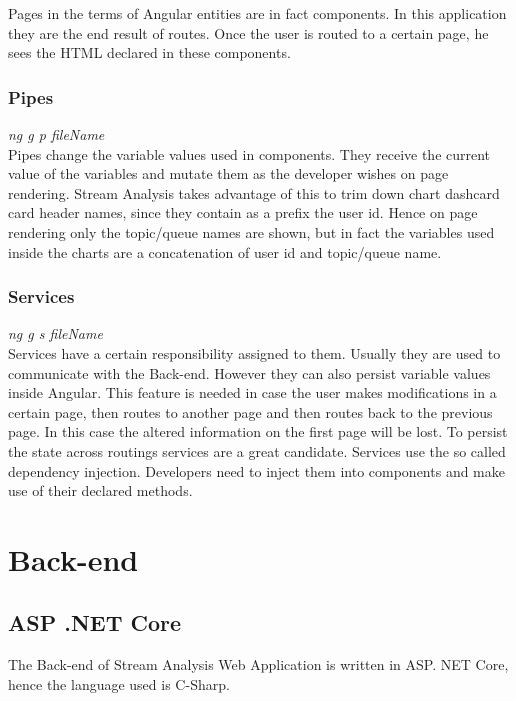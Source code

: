 Pages in the terms of Angular entities are in fact components. In this application they are the end result of routes. Once the user is routed to a certain page, he sees the HTML declared in these components.

\subsubsection{Pipes}
\label{chap:04:01:02:05}

\textit{ng g p fileName}\\

Pipes change the variable values used in components. They receive the current value of the variables and mutate them as the developer wishes on page rendering. Stream Analysis takes advantage of this to trim down chart dashcard card header names, since they contain as a prefix the user id. Hence on page rendering only the topic/queue names are shown, but in fact the variables used inside the charts are a concatenation of user id and topic/queue name.

\subsubsection{Services}
\label{chap:04:01:02:06}

\textit{ng g s fileName}\\

Services have a certain responsibility assigned to them. Usually they are used to communicate with the Back-end. However they can also persist variable values inside Angular. This feature is needed in case the user makes modifications in a certain page, then routes to another page and then routes back to the previous page. In this case the altered information on the first page will be lost. To persist the state across routings services are a great candidate.
Services use the so called dependency injection. Developers need to inject them into components and make use of their declared methods.

\section{Back-end}
\label{chap:04:02}

\subsection{ASP .NET Core}
\label{chap:04:02:01}

The Back-end of Stream Analysis Web Application is written in ASP. NET Core, hence the language used is C-Sharp.\\

